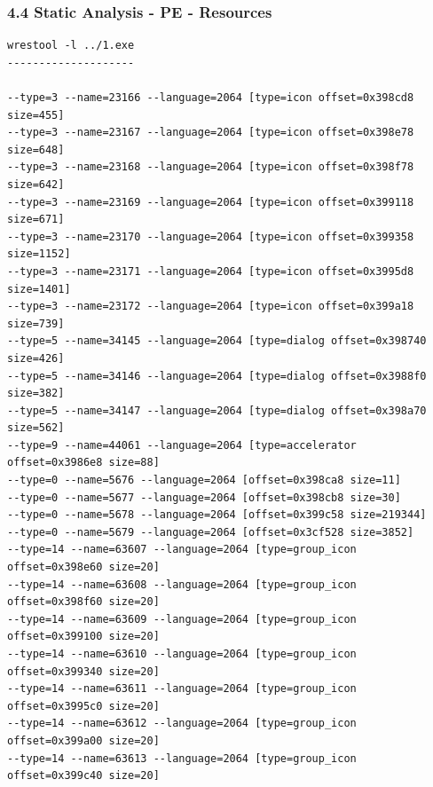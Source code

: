 \begin{frame}[fragile]
  \frametitle{4.4 Static Analysis - PE - Resources}
  \begin{lstlisting}[basicstyle=\tiny]
wrestool -l ../1.exe
--------------------

--type=3 --name=23166 --language=2064 [type=icon offset=0x398cd8 size=455]
--type=3 --name=23167 --language=2064 [type=icon offset=0x398e78 size=648]
--type=3 --name=23168 --language=2064 [type=icon offset=0x398f78 size=642]
--type=3 --name=23169 --language=2064 [type=icon offset=0x399118 size=671]
--type=3 --name=23170 --language=2064 [type=icon offset=0x399358 size=1152]
--type=3 --name=23171 --language=2064 [type=icon offset=0x3995d8 size=1401]
--type=3 --name=23172 --language=2064 [type=icon offset=0x399a18 size=739]
--type=5 --name=34145 --language=2064 [type=dialog offset=0x398740 size=426]
--type=5 --name=34146 --language=2064 [type=dialog offset=0x3988f0 size=382]
--type=5 --name=34147 --language=2064 [type=dialog offset=0x398a70 size=562]
--type=9 --name=44061 --language=2064 [type=accelerator offset=0x3986e8 size=88]
--type=0 --name=5676 --language=2064 [offset=0x398ca8 size=11]
--type=0 --name=5677 --language=2064 [offset=0x398cb8 size=30]
--type=0 --name=5678 --language=2064 [offset=0x399c58 size=219344]
--type=0 --name=5679 --language=2064 [offset=0x3cf528 size=3852]
--type=14 --name=63607 --language=2064 [type=group_icon offset=0x398e60 size=20]
--type=14 --name=63608 --language=2064 [type=group_icon offset=0x398f60 size=20]
--type=14 --name=63609 --language=2064 [type=group_icon offset=0x399100 size=20]
--type=14 --name=63610 --language=2064 [type=group_icon offset=0x399340 size=20]
--type=14 --name=63611 --language=2064 [type=group_icon offset=0x3995c0 size=20]
--type=14 --name=63612 --language=2064 [type=group_icon offset=0x399a00 size=20]
--type=14 --name=63613 --language=2064 [type=group_icon offset=0x399c40 size=20] 
  \end{lstlisting}
\end{frame}


